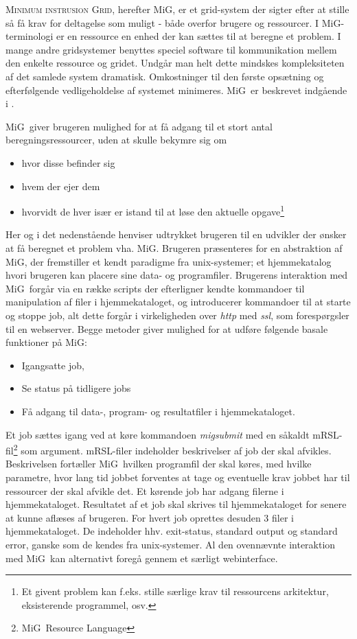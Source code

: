 \documentclass[pdf,draft,a4paper,11pt]{article}
\newcommand{\mig}{MiG}
\begin{document}
\textsc{Minimum instrusion Grid}, herefter \mig, er et grid-system der sigter efter at stille så få krav for deltagelse som muligt - både overfor brugere og ressourcer. I \mig-terminologi er en ressource en enhed der kan sættes til at beregne et problem. I mange andre gridsystemer benyttes speciel software til kommunikation mellem den enkelte ressource og gridet. Undgår man helt dette mindskes kompleksiteten af det samlede system dramatisk. Omkostninger til den første opsætning og efterfølgende vedligeholdelse af systemet minimeres.  \mig\ er beskrevet indgående i \cite{simplemig,mig}.

\mig\ giver brugeren mulighed for at få adgang til et stort antal beregningsressourcer, uden at skulle bekymre sig om 
\begin{itemize}
	\item hvor disse befinder sig
	\item hvem der ejer dem
	\item hvorvidt de hver især er istand til at løse den aktuelle opgave\footnote{Et givent problem kan f.eks. stille særlige krav til ressourcens arkitektur, eksisterende programmel, osv.}
\end{itemize}
Her og i det nedenstående henviser udtrykket brugeren til en udvikler der ønsker at få beregnet et problem vha. \mig . Brugeren præsenteres for en abstraktion af \mig, der fremstiller et kendt paradigme fra unix-systemer; et hjemmekatalog hvori brugeren kan placere sine data- og programfiler. Brugerens interaktion med \mig\ forgår via en række scripts der efterligner kendte kommandoer til manipulation af filer i hjemmekataloget, og introducerer kommandoer til at starte og stoppe job, alt dette forgår i virkeligheden over \emph{http} med \emph{ssl}, som forespørgsler til en webserver. 
Begge metoder giver mulighed for at udføre følgende basale funktioner på \mig:
\begin{itemize}
	\item Igangsatte job, 

	\item Se status på tidligere jobs

	\item Få adgang til data-, program- og resultatfiler i hjemmekataloget. 
\end{itemize}

Et job sættes igang ved at køre kommandoen \emph{migsubmit} med en såkaldt mRSL-fil\footnote{\mig\ Resource Language} som argument. mRSL-filer indeholder beskrivelser af job der skal afvikles. Beskrivelsen fortæller \mig\ hvilken programfil der skal køres, med hvilke parametre, hvor lang tid jobbet forventes at tage og eventuelle krav jobbet har til ressourcer der skal afvikle det. Et kørende job har adgang filerne i  hjemmekataloget. Resultatet af et job skal skrives til hjemmekataloget for senere at kunne aflæses af brugeren. For hvert job oprettes desuden 3 filer i hjemmekataloget. De indeholder hhv. exit-status, standard output og standard error, ganske som de kendes fra unix-systemer. Al den ovennævnte interaktion med \mig\ kan alternativt foregå gennem et særligt webinterface. 
\end{document}

